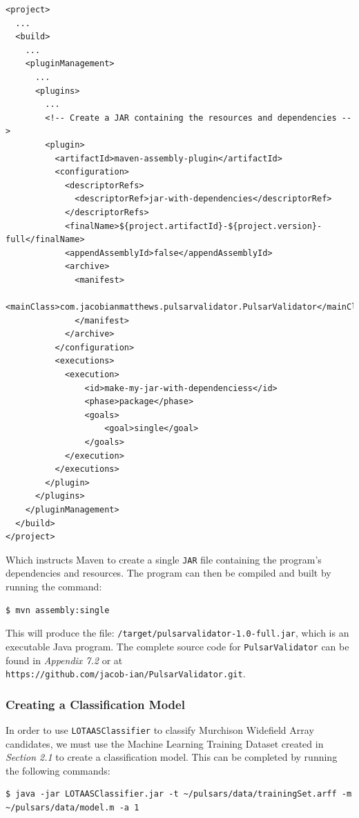 \documentclass{article}
\begin{document}
\begin{lstlisting}[numbers=none, title=pom.xml]
<project>
  ...
  <build>
    ...
    <pluginManagement>
      ...
      <plugins>
        ...
        <!-- Create a JAR containing the resources and dependencies -->
        <plugin>
          <artifactId>maven-assembly-plugin</artifactId>
          <configuration>
            <descriptorRefs>
              <descriptorRef>jar-with-dependencies</descriptorRef>
            </descriptorRefs>
            <finalName>${project.artifactId}-${project.version}-full</finalName>
            <appendAssemblyId>false</appendAssemblyId>
            <archive>
              <manifest>
                <mainClass>com.jacobianmatthews.pulsarvalidator.PulsarValidator</mainClass>
              </manifest>
            </archive>
          </configuration>
          <executions>
            <execution>
                <id>make-my-jar-with-dependenciess</id>
                <phase>package</phase>
                <goals>
                    <goal>single</goal>
                </goals>
            </execution>
          </executions>
        </plugin>
      </plugins>
    </pluginManagement>
  </build>
</project>
\end{lstlisting}

Which instructs Maven to create a single \verb|JAR| file containing the program's dependencies and resources. The program can then be compiled and built by running the command:

\begin{lstlisting}[numbers=none]
$ mvn assembly:single
\end{lstlisting}

This will produce the file: \verb|/target/pulsarvalidator-1.0-full.jar|, which is an executable Java program. The complete source code for \verb|PulsarValidator| can be found in \emph{Appendix 7.2} or at \\\verb|https://github.com/jacob-ian/PulsarValidator.git|.

\subsubsection{Creating a Classification Model}

In order to use \verb|LOTAASClassifier| to classify Murchison Widefield Array candidates, we must use the Machine Learning Training Dataset created in \emph{Section 2.1} to create a classification model. This can be completed by running the following commands:

\begin{lstlisting}[numbers=none]
$ java -jar LOTAASClassifier.jar -t ~/pulsars/data/trainingSet.arff -m ~/pulsars/data/model.m -a 1
\end{lstlisting}
\end{document}
